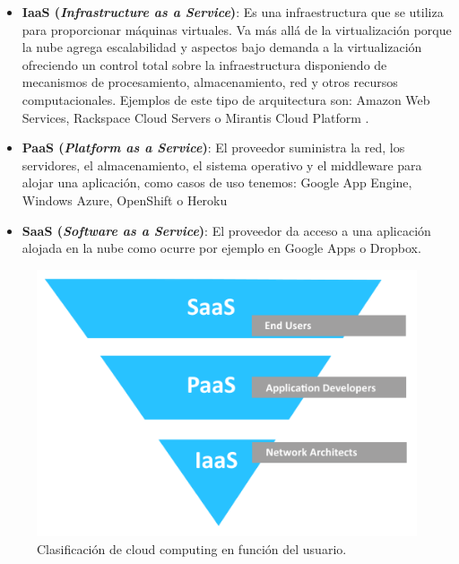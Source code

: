 \begin{itemize}
\item 
\textbf{IaaS (\textit{Infrastructure as a Service})}: Es una infraestructura que se utiliza para proporcionar máquinas virtuales. Va más allá de la virtualización porque la nube agrega escalabilidad y aspectos bajo demanda a la virtualización ofreciendo un control total sobre la infraestructura disponiendo de mecanismos de procesamiento, almacenamiento, red y otros recursos computacionales. Ejemplos de este tipo de arquitectura son: Amazon Web Services, Rackspace Cloud Servers o Mirantis Cloud Platform .
\end{itemize}


\begin{itemize}
\item 
\textbf{PaaS (\textit{Platform as a Service})}: El proveedor suministra la red, los servidores, el almacenamiento, el sistema operativo y el middleware para alojar una aplicación, como casos de uso tenemos: Google App Engine, Windows Azure, OpenShift o Heroku
\end{itemize}

\begin{itemize}
\item \textbf{SaaS (\textit{Software as a Service})}: El proveedor da acceso a una aplicación alojada en la nube como ocurre por ejemplo en Google Apps o Dropbox.
\end{itemize}


\begin{figure}[!ht]  \centering
    \includegraphics[width=1\textwidth]{imagenes/capitulo1/saas-paas-iaas.png}
    \caption{Clasificación de cloud computing en función del usuario.}
	\vspace{0.3cm}
    \label{clas-cloud-usuario}
\end{figure}

